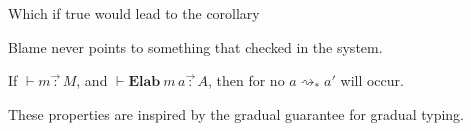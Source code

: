 Which if true would lead to the corollary
\begin{conjecture}
Blame never points to something that checked in the \bidir{} system.
 
If $\vdash m\overrightarrow{\,:\,}M$, and $\vdash\textbf{Elab}\ m\,a\overrightarrow{\,:\,}A$, then for no $a\rightsquigarrow_{*}a'$ will  occur.
 
\end{conjecture}
 
These properties are inspired by the gradual guarantee\cite{siek_et_al:LIPIcs:2015:5031} for gradual typing.